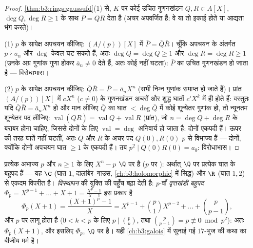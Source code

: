\begin{proof}
\cref{thm:b3:rings:gaussufd}(1) से, $K$ पर कोई उचित गुणनखंडन $Q, R \in A[X]$, $\deg Q, \deg R \geq 1$ के साथ
$P = QR$ देता है (अचर अपवर्जित हैं: वे या तो इकाई होते या आद्यता
भंग करते)।

(1) $p$ के सापेक्ष अपचयन कीजिए: $(A/(p))[X]$ में $\bar P = \bar Q\bar R$। चूँकि अपचयन
के अंतर्गत $p \nmid a_n$ और $\deg$ केवल घट सकते हैं, अतः $\deg \bar
Q = \deg Q \geq 1$ और $\deg\bar R = \deg R \geq 1$
(उनके अग्र गुणांक गुणा होकर $\bar a_n \neq 0$ देते हैं, अतः कोई नहीं घटता):
$\bar P$ का उचित गुणनखंडन हो जाता है --- विरोधाभास।

(2) $p$ के सापेक्ष अपचयन कीजिए: $\bar Q \bar R = \bar P = \bar a_n X^n$ (सभी निम्न गुणांक समाप्त
हो जाते हैं)। प्रांत $(A/(p))[X]$ में $cX^n$ ($c \ne 0$) के गुणनखंडन अचरों
और शुद्ध घातों $c'X^k$ में ही होते हैं: वस्तुतः यदि $\bar Q\bar R = \bar a_nX^n$ हो और
मान लीजिए $\bar Q$ का घात $< \deg\bar Q$ में कोई शून्येतर गुणांक हो, तो
न्यूनतम शून्येतर पद लीजिए: $\operatorname{val}(\bar Q\bar R) =
\operatorname{val}\bar Q + \operatorname{val}\bar R$ (प्रांत), जो $n = \deg\bar Q + \deg\bar R$ के बराबर
होना चाहिए, जिससे दोनों के लिए $\operatorname{val} = \deg$ अनिवार्य हो जाता है: दोनों
एकपदी हैं। ऊपर की तरह घातें नहीं घटतीं, अतः $Q$ और $R$ के
अचर पद $Q(0), R(0)$ $p$ से विभाज्य हैं --- दोनों, क्योंकि दोनों
अपचयन घात $\geq 1$ के एकपदी हैं। तब $p^2 \mid
Q(0)R(0) = a_0$: विरोधाभास।
\end{proof}

\begin{example}\label{ex:b3:rings:eisenstein}
प्रत्येक अभाज्य $p$ और $n
\geq 1$ के लिए $X^n - p$ $\Q$ पर  है
($p$ पर ): अर्थात् $\Q$ पर प्रत्येक घात के 
बहुपद हैं --- यह $\C$ (घात $1$, दालांबेर--गाउस, \cref{ch:b3:holomorphic} में
सिद्ध) और $\R$ (घात $1, 2$) से एकदम विपरीत है। \emph{विस्थापन}
की युक्ति  की पहुँच बढ़ा देती है: $p$-वाँ
\emph{वृत्तखंडी बहुपद} $\Phi_p = X^{p-1} +
\dots + X + 1 = \frac{X^p - 1}{X - 1}$ इस प्रकार है
\[
\Phi_p(X + 1) = \frac{(X+1)^p - 1}{X}
= X^{p-1} + \binom{p}{1}X^{p-2} + \dots + \binom{p}{p-1},
\]
और $p$ पर  लागू होता है ($0 < k < p$ के लिए $p \mid \binom pk$, तथा
$\binom{p}{p-1} = p \not\equiv 0 \bmod p^2$): अतः $\Phi_p(X+1)$, और इसलिए $\Phi_p$, $\Q$ पर  है। यही
\cref{ch:b3:galois} में सुनाई गई $17$-भुज की कथा का बीजीय मर्म है।
\end{example}

